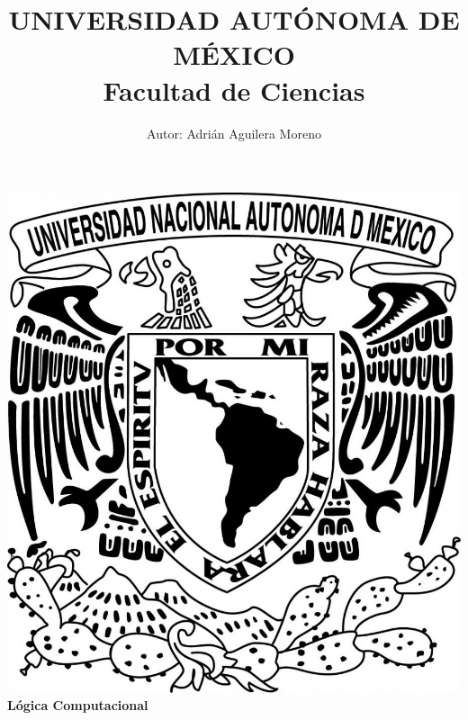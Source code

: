 \documentclass{article}
\begin{document}
\title{UNIVERSIDAD AUT\'ONOMA DE M\'EXICO\\ Facultad de Ciencias}
\author{Autor: Adri\'an Aguilera Moreno}
\date{}
\maketitle
\begin{center}
  \includegraphics[scale=0.20]{../Imagen/Portada.jpg}\\[0.4cm]
  \Large
  \bf{Lógica Computacional}
  \normalsize
\end{center}
\newpage
{}
\end{document}
